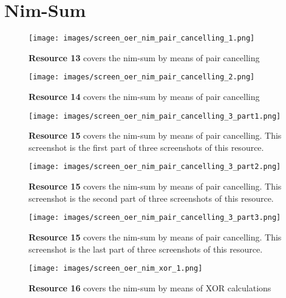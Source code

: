 \section{Nim-Sum}
\begin{figure}[ht]
    \centering
    \texttt{[image: images/screen\_oer\_nim\_pair\_cancelling\_1.png]}
	\caption[Resource 13]{\textbf{Resource 13} covers the nim-sum
    by means of pair cancelling}
    \label{fig:apx_screen_oer_nim_pair_cancelling_1}
\end{figure}
\begin{figure}[ht]
    \centering
    \texttt{[image: images/screen\_oer\_nim\_pair\_cancelling\_2.png]}
	\caption[Resource 14]{\textbf{Resource 14} covers the nim-sum
    by means of pair cancelling}
    \label{fig:apx_screen_oer_nim_pair_cancelling_2}
\end{figure}
\begin{figure}[ht]
    \centering
    \texttt{[image: images/screen\_oer\_nim\_pair\_cancelling\_3\_part1.png]}
	\caption[Resource 15 part 1]{\textbf{Resource 15} covers the nim-sum
    by means of pair cancelling. This screenshot is the first part of three
screenshots of this resource.}
    \label{fig:apx_screen_oer_nim_pair_cancelling_3_part1}
\end{figure}
\begin{figure}[ht]
    \centering
    \texttt{[image: images/screen\_oer\_nim\_pair\_cancelling\_3\_part2.png]}
	\caption[Resource 15 part 2]{\textbf{Resource 15} covers the nim-sum
    by means of pair cancelling. This screenshot is the second part of three
screenshots of this resource.}
    \label{fig:apx_screen_oer_nim_pair_cancelling_3_part2}
\end{figure}
\begin{figure}[ht]
    \centering
    \texttt{[image: images/screen\_oer\_nim\_pair\_cancelling\_3\_part3.png]}
	\caption[Resource 15 part 3]{\textbf{Resource 15} covers the nim-sum
    by means of pair cancelling. This screenshot is the last part of three
screenshots of this resource.}
    \label{fig:apx_screen_oer_nim_pair_cancelling_3_part3}
\end{figure}
\begin{figure}[ht]
    \centering
    \texttt{[image: images/screen\_oer\_nim\_xor\_1.png]}
	\caption[Resource 16]{\textbf{Resource 16} covers the nim-sum
    by means of XOR calculations}
    \label{fig:apx_screen_oer_nim_xor_1}
\end{figure}
